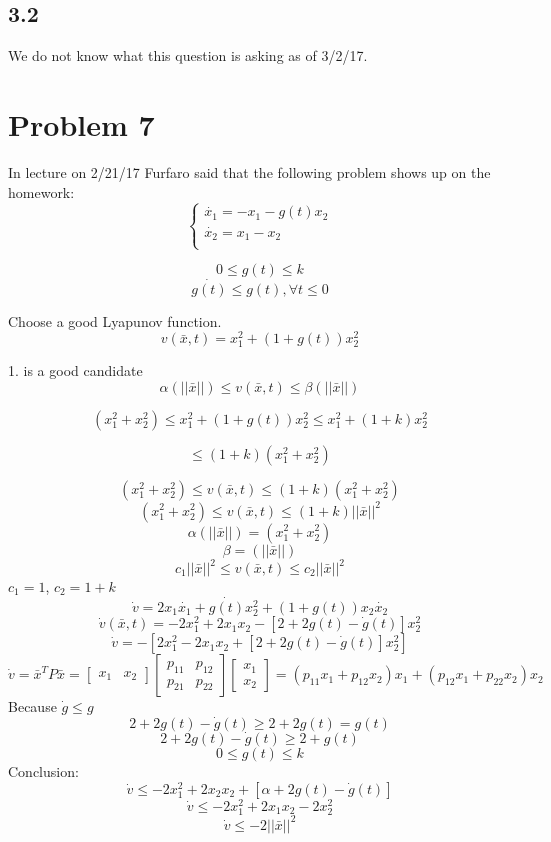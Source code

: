 \documentclass[12pt]{article}
\begin{document}
\subsection*{3.2}
We do not know what this question is asking as of 3/2/17.

\section*{Problem 7}
In lecture on 2/21/17 Furfaro said that the following problem shows up on the homework:
$$\begin{cases}\dot{x_1}=-x_1-g(t)x_2\\ 
\dot{x_2}=x_1-x_2\\
\end{cases}$$ 

$$0\leq g(t)\leq k$$
$$\dot{g(t)} \leq g(t), \forall t \leq 0$$

Choose a good Lyapunov function. 
$$v(\bar{x},t)=x_1^2+(1+g(t))x_2^2$$

1. is a good candidate\\
$$\alpha(||\bar{x}||)\leq v(\bar{x},t)\leq \beta(||\bar{x}||)$$

$$(x_1^2+x_2^2)\leq x_1^2+(1+g(t))x_2^2\leq x_1^2+(1+k)x_2^2$$

$$\leq(1+k)(x_1^2+x_2^2)$$

$$(x_1^2+x_2^2)\leq v(\bar{x},t)\leq (1+k)(x_1^2+x_2^2)$$
$$(x_1^2+x_2^2)\leq v(\bar{x},t)\leq (1+k)||\bar{x}||^2$$
$$\alpha(||\bar{x}||)=(x_1^2+x_2^2)$$
$$\beta=(||\bar{x}||)$$
$$c_1||\bar{x}||^2\leq v(\bar{x},t)\leq c_2||\bar{x}||^2$$
$c_1=1$, $c_2=1+k$
$$\dot{v}=2x_1\dot{x_1}+\dot{g(t)}x_2^2+(1+g(t))x_2\dot{x_2}$$
$$\dot{v}(\bar{x},t)=-2x_1^2+2x_1x_2-[2+2g(t)-\dot{g}(t)]x_2^2$$
$$\dot{v}=-[2x_1^2-2x_1x_2+[2+2g(t)-\dot{g}(t)]x_2^2]$$
$$\dot{v}=\bar{x}^TP\bar{x}=\begin{bmatrix} x_1 & x_2 \end{bmatrix}
\begin{bmatrix} p_{11} & p_{12} \\
p_{21} & p_{22} \end{bmatrix}\begin{bmatrix} x_1 \\ x_2 \end{bmatrix} = (p_{11}x_1+p_{12}x_2)x_1+(p_{12}x_1+p_{22}x_2)x_2$$
Because $\dot{g}\leq g$
$$2+2g(t)-\dot{g}(t)\geq 2+2g(t)=g(t)$$
$$2+2g(t)-\dot{g}(t)\geq 2+g(t)$$
$$0\leq g(t) \leq k$$
Conclusion:
$$\dot{v}\leq -2x_1^2+2x_2x_2+[\alpha+2g(t)-\dot{g}(t)]$$
$$\dot{v}\leq -2x_1^2+2x_1x_2-2x_2^2$$
$$\dot{v}\leq -2||\bar{x}||^2$$
\end{document}
